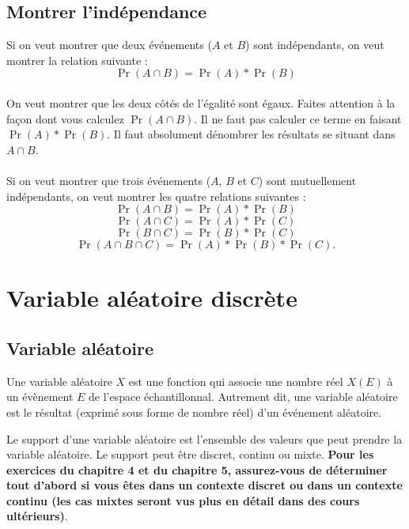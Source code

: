 \documentclass[10pt, french]{article}
\begin{document}
\begin{multicols*}{2}
\subsection{Montrer l'indépendance}
\begin{definitionNOHFILL}
Si on veut montrer que deux événements  ($A$ et $B$) sont indépendants, on veut montrer la relation suivante : \\
$$ \Pr(A \cap B) = \Pr(A) * \Pr(B) $$\\
On veut montrer que les deux côtés de l'égalité sont égaux. Faites attention à la façon dont vous calculez $\Pr(A \cap B)$. Il ne faut pas calculer ce terme en faisant $\Pr(A) * \Pr(B)$. Il faut absolument dénombrer les résultats se situant dans $A \cap B$.\\
\\
Si on veut montrer que trois événements ($A$, $B$ et $C$) sont mutuellement indépendants, on veut montrer les quatre relations suivantes : \\
$$\Pr(A \cap B) =  \Pr(A) * \Pr(B)$$
$$\Pr(A \cap C) =  \Pr(A) * \Pr(C)$$
$$\Pr(B \cap C) =  \Pr(B) * \Pr(C)$$
$$\Pr(A \cap B \cap C) =  \Pr(A) * \Pr(B) * \Pr(C).$$
\end{definitionNOHFILL}
\vfill\null
\pagebreak

   
   



\pagebreak
\section{Variable aléatoire discrète}
\subsection{Variable aléatoire}

\begin{definitionNOHFILL}
Une variable aléatoire $X$ est une fonction qui associe une nombre réel $X(E)$ à un évènement $E$ de l'espace échantillonnal. Autrement dit, une variable aléatoire est le résultat (exprimé sous forme de nombre réel) d'un événement aléatoire.
\end{definitionNOHFILL}

\begin{definitionNOHFILL}
Le support d'une variable aléatoire est l'ensemble des valeurs que peut prendre la variable aléatoire. Le support peut être discret, continu ou mixte. \textbf{Pour les exercices du chapitre 4 et du chapitre 5, assurez-vous de déterminer tout d'abord si vous êtes dans un contexte discret ou dans un contexte continu (les cas mixtes seront vus plus en détail dans des cours ultérieurs)}. 
\end{definitionNOHFILL}


\end{multicols*}
\end{document}
